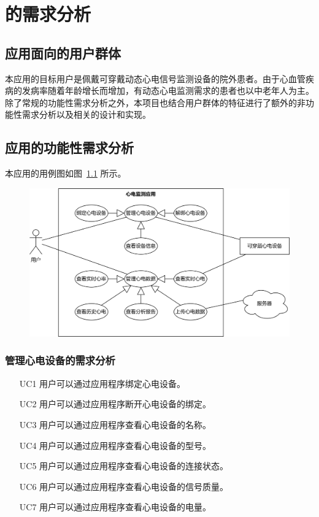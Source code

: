 

\chapter{\app 的需求分析}\label{ch:req}


\section{应用面向的用户群体}\label{sec:target-user}

本应用的目标用户是佩戴可穿戴动态心电信号监测设备的院外患者。由于心血管疾病的发病率随着年龄增长而增加\cite{Zhongguoxinxieguanjiankangyujibingbaogao20212022}，有动态心电监测需求的患者也以中老年人为主。除了常规的功能性需求分析之外，本项目也结合用户群体的特征进行了额外的非功能性需求分析以及相关的设计和实现。


\section{应用的功能性需求分析}\label{sec:func-req}

本应用的用例图如图~\ref{fig:use-case} 所示。

\begin{figure}[ht]
    \includegraphics[width=\textwidth]{../assets/use-case.drawio}
    \label{fig:use-case}
\end{figure}

\subsection{管理心电设备的需求分析}\label{subsec:device-req}

\begin{itemize}
    \item[UC1] 用户可以通过应用程序绑定心电设备。
    \item[UC2] 用户可以通过应用程序断开心电设备的绑定。
    \item[UC3] 用户可以通过应用程序查看心电设备的名称。
    \item[UC4] 用户可以通过应用程序查看心电设备的型号。
    \item[UC5] 用户可以通过应用程序查看心电设备的连接状态。
    \item[UC6] 用户可以通过应用程序查看心电设备的信号质量。
    \item[UC7] 用户可以通过应用程序查看心电设备的电量。
\end{itemize}

